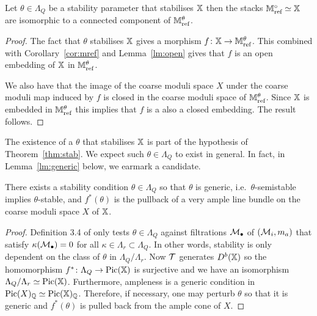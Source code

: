 \documentclass[12pt]{amsart}
\begin{document}
\begin{theorem}\label{thm:stab}
Let $\theta \in \Lambda_Q$ be a stability parameter that stabilises $\mathbb{X}$ then the stacks $\mathbb{M}_{\textup{ref}}^\circ \simeq \mathbb{X}$ are isomorphic to a connected component of $\mathbb{M}_{\textup{ref}}^\theta$.
\end{theorem}

\begin{proof}
The fact that $\theta$ stabilises $\mathbb{X}$ gives a morphism $f \colon \mathbb{X} \rightarrow \mathbb{M}_{\text{ref}}^\theta$.
This combined with Corollary~\ref{cor:mref} and Lemma~\ref{lm:open} gives that $f$ is an open embedding of $\mathbb{X}$ in $\mathbb{M}_{\text{ref}}^\theta$.

We also have that the image of the coarse moduli space $X$ under the coarse moduli map induced by $f$ is closed in the coarse moduli space of $\mathbb{M}_\text{ref}^\theta$. 
Since $\mathbb{X}$ is embedded in $\mathbb{M}_\text{ref}^\theta$ this implies that $f$ is a also a closed embedding.
The result follows.
\end{proof}

\begin{remark}
The existence of a $\theta$ that stabilises $\mathbb{X}$ is part of the hypothesis of Theorem~\ref{thm:stab}.
We expect such $\theta \in \Lambda_Q$ to exist in general.
In fact, in Lemma~\ref{lm:generic} below, we earmark a candidate.
\end{remark}

\begin{lemma}\label{lm:generic}
There exists a stability condition $\theta \in \Lambda_Q$ so that $\theta$ is generic, i.e.\ $\theta$-semistable implies $\theta$-stable, and $f^*(\theta)$ is the pullback of a very ample line bundle on the coarse moduli space $X$ of $\mathbb{X}$.
\end{lemma}

\begin{proof}
Definition 3.4 of \cite{Abd} only tests $\theta \in \Lambda_{Q}$ against filtrations $\mathcal{M}_\bullet$ of $(\mathcal{M}_i, m_a)$ that satisfy $\kappa(\mathcal{M}_\bullet)=0$ for all $\kappa\in \Lambda_r \subset \Lambda_{Q}$.
In other words, stability is only dependent on the class of $\theta$ in $\Lambda_{Q}/\Lambda_r$.
Now $\mathcal{T}$ generates $D^b(\mathbb{X})$ so the homomorphism $f^*\colon \Lambda_{Q} \rightarrow \operatorname{Pic}(\mathbb{X})$ is surjective and we have an isomorphism $\Lambda_{Q}/\Lambda_r \simeq \operatorname{Pic}(\mathbb{X})$.
Furthermore, ampleness is a generic condition in $\operatorname{Pic}(X)_{\mathbb{Q}} \simeq \operatorname{Pic}(\mathbb{X})_{\mathbb{Q}}$.
Therefore, if necessary, one may perturb $\theta$ so that it is generic and $f^*(\theta)$ is pulled back from the ample cone of $X$.
\end{proof}
\end{document}
